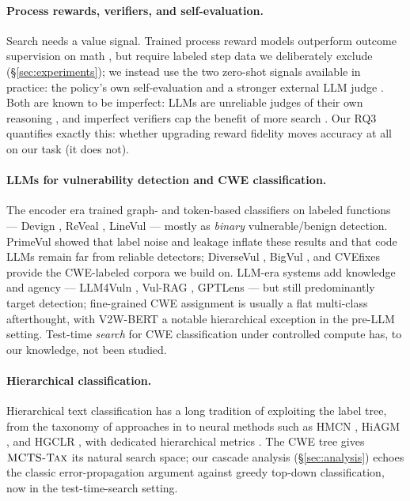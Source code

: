 \paragraph{Process rewards, verifiers, and self-evaluation.}
Search needs a value signal. Trained process reward models outperform outcome
supervision on math \citep{uesato2022outcome,lightman2024verify}, but require
labeled step data we deliberately exclude (\S\ref{sec:experiments}); we instead
use the two zero-shot signals available in practice: the policy's own
self-evaluation and a stronger external LLM judge \citep{zheng2023judge}. Both are
known to be imperfect: LLMs are unreliable judges of their own reasoning
\citep{huang2024selfcorrect}, and imperfect verifiers cap the benefit of more
search \citep{stroebl2024flaws}. Our RQ3 quantifies exactly this: whether upgrading
reward fidelity moves accuracy at all on our task (it does not).

\paragraph{LLMs for vulnerability detection and CWE classification.}
The encoder era trained graph- and token-based classifiers on labeled functions
--- Devign \citep{zhou2019devign}, ReVeal \citep{chakraborty2021reveal}, LineVul
\citep{fu2022linevul} --- mostly as \emph{binary} vulnerable/benign detection.
PrimeVul \citep{ding2024primevul} showed that label noise and leakage inflate
these results and that code LLMs remain far from reliable detectors; DiverseVul
\citep{chen2023diversevul}, BigVul \citep{fan2020bigvul}, and CVEfixes
\citep{bhandari2021cvefixes} provide the CWE-labeled corpora we build on.
LLM-era systems add knowledge and agency --- LLM4Vuln \citep{sun2024llm4vuln},
Vul-RAG \citep{du2024vulrag}, GPTLens \citep{hu2023gptlens} --- but still
predominantly target detection; fine-grained CWE assignment is usually a flat
multi-class afterthought, with V2W-BERT \citep{das2021v2wbert} a notable
hierarchical exception in the pre-LLM setting. Test-time \emph{search} for CWE
classification under controlled compute has, to our knowledge, not been studied.

\paragraph{Hierarchical classification.}
Hierarchical text classification has a long tradition of exploiting the label
tree, from the taxonomy of approaches in \citet{silla2011survey} to neural
methods such as HMCN \citep{wehrmann2018hmcn}, HiAGM \citep{zhou2020hiagm}, and
HGCLR \citep{wang2022hgclr}, with dedicated hierarchical metrics
\citep{kosmopoulos2015evaluation}. The CWE tree gives $\textsc{MCTS-Tax}$ its natural
search space; our cascade analysis (\S\ref{sec:analysis}) echoes the classic
error-propagation argument against greedy top-down classification, now in the
test-time-search setting.

